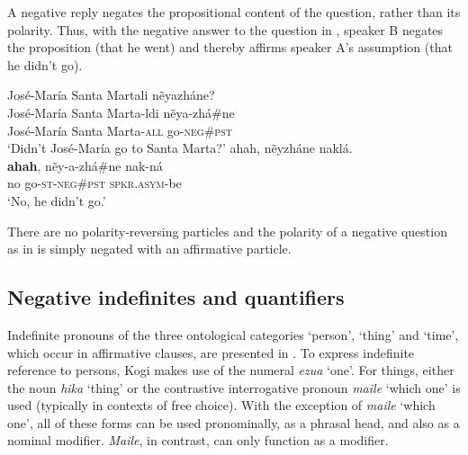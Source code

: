 \documentclass[output=paper,colorlinks,citecolor=brown]{langscibook}
\begin{document}
A negative reply negates the propositional content of the question, rather than its polarity. Thus, with the negative answer to the question in , speaker B negates the proposition (that he went) and thereby affirms speaker A’s assumption (that he didn't go).
\ea\label{ex:kog:59}
    \begin{xlist}
     José-María Santa Martali nẽyazháne?\label{ex:kog:59q}\\
        \gll  José-María Santa Marta-ldi nẽya-zhá\#ne\\ 
               José-María Santa Marta-\textsc{all} go-\textsc{neg\#pst}\\ 
        \glt  ‘Didn’t José-María go to Santa Marta?’
     ahah, nẽyzháne naklá.\label{ex:kog:59a}\\
        \gll  \textbf{ahah}, nẽy{}-a{}-zhá\#ne nak{}-ná\\ 
               no go{}-\textsc{st{}-neg\#pst} \textsc{spkr.asym-}be \\
        \glt  ‘No, he didn't go.’
    \end{xlist}
\z 

There are no polarity-reversing particles and the polarity of a negative question as in  is simply negated with an affirmative particle.

\subsection{Negative indefinites and quantifiers}\label{sec:kog:3.2}
\largerpage
Indefinite pronouns of the three ontological categories ‘person’, ‘thing’ and ‘time’, which occur in affirmative clauses, are presented in . To express indefinite reference to persons, Kogi makes use of the numeral \textit{ezua} ‘one’. For things, either the noun \textit{hika} ‘thing’ or the contrastive interrogative pronoun \textit{maile} ‘which one’ is used (typically in contexts of free choice). With the exception of \textit{maile} ‘which one’, all of these forms can be used pronominally, as a phrasal head, and also as a nominal modifier. \textit{Maile}, in contrast, can only function as a modifier.
\end{document}
